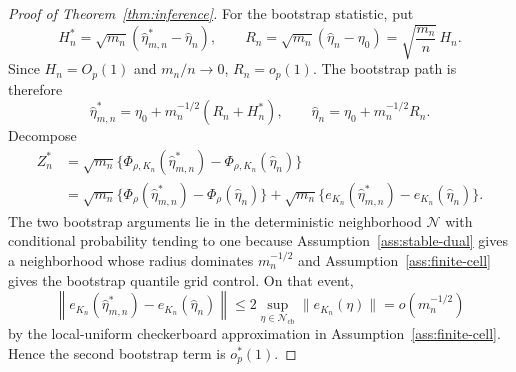 \documentclass[11pt]{article}
\theoremstyle{definition}
\theoremstyle{plain}
\theoremstyle{remark}
\begin{document}
\begin{proof}[Proof of Theorem~\ref{thm:inference}]
For the bootstrap statistic, put
\[
H_n^*=\sqrt{m_n}(\widehat\eta_{m,n}^*-\widehat\eta_n),
\qquad
R_n=\sqrt{m_n}(\widehat\eta_n-\eta_0)=\sqrt{\frac{m_n}{n}}\,H_n.
\]
Since \(H_n=O_p(1)\) and \(m_n/n\to0\), \(R_n=o_p(1)\).  The bootstrap path is therefore
\[
\widehat\eta_{m,n}^*=\eta_0+m_n^{-1/2}(R_n+H_n^*),
\qquad
\widehat\eta_n=\eta_0+m_n^{-1/2}R_n.
\]
Decompose
\[
\begin{aligned}
Z_n^*
&=\sqrt{m_n}\{\Phi_{\rho,K_n}(\widehat\eta_{m,n}^*)-\Phi_{\rho,K_n}(\widehat\eta_n)\}\\
&=\sqrt{m_n}\{\Phi_\rho(\widehat\eta_{m,n}^*)-\Phi_\rho(\widehat\eta_n)\}
+\sqrt{m_n}\{e_{K_n}(\widehat\eta_{m,n}^*)-e_{K_n}(\widehat\eta_n)\}.
\end{aligned}
\]
The two bootstrap arguments lie in the deterministic neighborhood \(\mathcal N\) with conditional probability tending to one because Assumption~\ref{ass:stable-dual} gives a neighborhood whose radius dominates \(m_n^{-1/2}\) and Assumption~\ref{ass:finite-cell} gives the bootstrap quantile grid control.  On that event,
\[
\left\|e_{K_n}(\widehat\eta_{m,n}^*)-e_{K_n}(\widehat\eta_n)\right\|
\le 2\sup_{\eta\in\mathcal N_{\mathrm{cb}}}\|e_{K_n}(\eta)\|
=o(m_n^{-1/2})
\]
by the local-uniform checkerboard approximation in Assumption~\ref{ass:finite-cell}.  Hence the second bootstrap term is \(o_p^*(1)\).


\end{proof}
\end{document}
